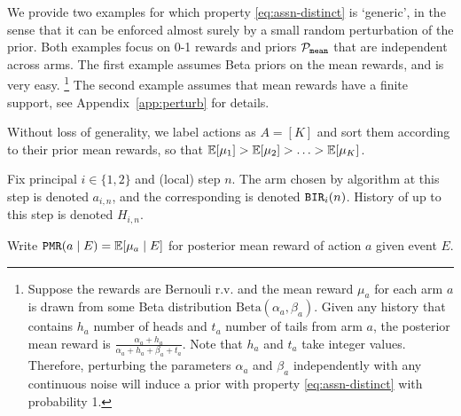We provide two examples for which property \eqref{eq:assn-distinct} is `generic', in the sense that it can be enforced almost surely by a
  small random perturbation of the prior. Both examples focus on 0-1 rewards and priors $\mathcal{P}_\mathtt{mean}$ that are independent across arms. The first example
  assumes Beta priors on the mean rewards, and is very easy.%
  \footnote{Suppose the rewards are Bernouli r.v. and the mean reward
    $\mu_a$ for each arm $a$ is drawn from some Beta distribution
    $\text{Beta}(\alpha_a, \beta_a)$. Given any history that contains
    $h_a$ number of heads and $t_a$ number of tails from arm $a$, the
    posterior mean reward is
    $\frac{\alpha_a + h_a}{\alpha_a + h_a + \beta_a + t_a}$. Note that
    $h_a$ and $t_a$ take integer values. Therefore, perturbing the
    parameters $\alpha_a$ and $\beta_a$ independently with any
    continuous noise will induce a prior with property
    \eqref{eq:assn-distinct} with probability 1.  }  The second
  example assumes that mean rewards have a
  finite support, see Appendix~\ref{app:perturb} for details.

 Without loss of generality, we label actions as $A=[K]$ and sort them according to their prior mean rewards, so that
    $ \E[\mu_1] > \E[\mu_2] > \ldots > \E[\mu_K]$.

Fix principal $i\in \{1,2\}$ and (local) step $n$. The arm chosen by algorithm \alg[i] at this step is denoted $a_{i,n}$, and the corresponding \BIR is denoted $\mathtt{BIR}_i(n)$. History of \alg[i] up to this step is denoted $H_{i,n}$.

Write
    $\PMR(a\mid E) = \E[\mu_a \mid E]$
for posterior mean reward of action $a$ given event $E$.




